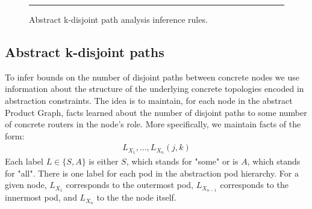 \documentclass[numbers, 10pt, preprint]{sigplanconf}
\begin{document}
\begin{figure}[t!]
  \begin{minipage}[t]{\linewidth}%
  \end{minipage}

  \vspace*{1em}
  \begin{minipage}[t]{\linewidth}%
  \end{minipage}

  \hrule
  \vspace*{1em}
  \caption{Abstract k-disjoint path analysis inference rules.}
  \label{fig:inference-rules}
\end{figure}


\subsection{Abstract k-disjoint paths}
\label{sec:property-checking}

To infer bounds on the number of disjoint paths between concrete nodes we use information about the structure of the underlying concrete topologies encoded in abstraction constraints.
%
The idea is to maintain, for each node in the abstract Product Graph, facts learned about the number of disjoint paths to some number of concrete routers in the node's role. More specifically, we maintain facts of the form:
%
\[ \begin{array}{c}
  L_{X_1}, \ldots, L_{X_n}(j,k)
\end{array} \]
\noindent
%
Each label $L \in \{S,A\}$ is either $S$, which stands for "some" or is $A$, which stands for "all". There is one label for each pod in the abstraction pod hierarchy. For a given node, $L_{X_1}$ corresponds to the outermost pod, $L_{X_{n-1}}$ corresponds to the innermost pod, and $L_{X_n}$ to the the node itself.
\end{document}
